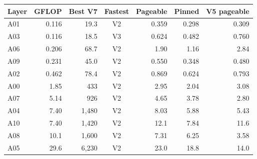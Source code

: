 \begin{tabular}{lrrcrrr}
\hline
\rowcolor{headgrey}
\textbf{Layer} & \textbf{GFLOP} & \textbf{Best V7} & \textbf{Fastest} & \textbf{Pageable} & \textbf{Pinned} & \textbf{V5 pageable} \\ \hline
A01 & 0.116 & 19.3 & V2 & 0.359 & 0.298 & 0.309 \\
A03 & 0.116 & 18.5 & V3 & 0.624 & 0.482 & 0.760 \\
A06 & 0.206 & 68.7 & V2 & 1.90 & 1.16 & 2.84 \\
A09 & 0.231 & 45.0 & V2 & 0.550 & 0.348 & 0.480 \\
A02 & 0.462 & 78.4 & V2 & 0.869 & 0.624 & 0.793 \\
A00 & 1.85 & 433 & V2 & 2.95 & 2.04 & 3.08 \\
A07 & 5.14 & 926 & V2 & 4.65 & 3.78 & 2.80 \\
A04 & 7.40 & 1{,}480 & V2 & 8.03 & 5.88 & 5.43 \\
A10 & 7.40 & 1{,}420 & V2 & 12.1 & 7.84 & 11.6 \\
A08 & 10.1 & 1{,}600 & V2 & 7.31 & 6.25 & 3.58 \\
A05 & 29.6 & 6{,}230 & V2 & 23.0 & 18.8 & 14.0 \\
\hline
\end{tabular}
